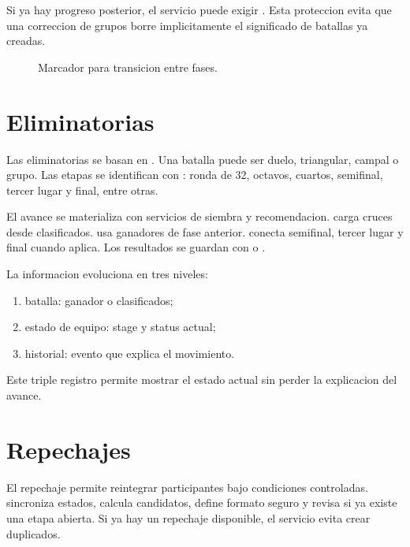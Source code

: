 Si ya hay progreso posterior, el servicio puede exigir . Esta proteccion evita que una correccion de grupos borre implicitamente el significado de batallas ya creadas.

\begin{figure}[H]
  \centering
  \caption{Marcador para transicion entre fases.}
  \label{fig:flujo-transicion-fases}
\end{figure}

\section{Eliminatorias}
\label{sec:flujo-eliminatorias}

Las eliminatorias se basan en . Una batalla puede ser duelo, triangular, campal o grupo. Las etapas se identifican con : ronda de 32, octavos, cuartos, semifinal, tercer lugar y final, entre otras.

El avance se materializa con servicios de siembra y recomendacion.  carga cruces desde clasificados.  usa ganadores de fase anterior.  conecta semifinal, tercer lugar y final cuando aplica. Los resultados se guardan con  o .

La informacion evoluciona en tres niveles:

\begin{enumerate}
  \item batalla: ganador o clasificados;
  \item estado de equipo: stage y status actual;
  \item historial: evento que explica el movimiento.
\end{enumerate}

Este triple registro permite mostrar el estado actual sin perder la explicacion del avance.

\section{Repechajes}
\label{sec:flujo-repechajes}

El repechaje permite reintegrar participantes bajo condiciones controladas.  sincroniza estados, calcula candidatos, define formato seguro y revisa si ya existe una etapa abierta. Si ya hay un repechaje disponible, el servicio evita crear duplicados.

